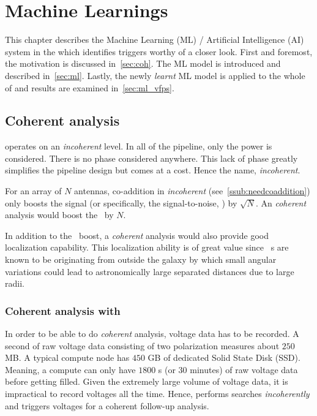 \chapter{Machine Learnings}
\label{ch:ml}

\par This chapter describes the Machine Learning (ML) / Artificial Intelligence (AI) system in the \vf which identifies triggers worthy of a closer look. First and foremost, the motivation is discussed in~\autoref{sec:coh}.
The ML model is introduced and described in~\autoref{sec:ml}. 
Lastly, the newly \emph{learnt} ML model is applied to the whole of \vfpfs and results are examined in~\autoref{sec:ml_vfps}.

\section {Coherent analysis}
\label{sec:coh}

\par \vf operates on an \emph{incoherent} level. In all of the pipeline, only the power is considered.
There is no phase considered anywhere. This lack of phase greatly simplifies the pipeline design but comes at a cost.
Hence the name, \emph{incoherent}.

\par For an array of $N$ antennas, co-addition in \emph{incoherent} (see~\autoref{ssub:needcoaddition}) only boosts the signal (or specifically, the signal-to-noise, \sn) by $\sqrt{N}$. 
An \emph{coherent} analysis would boost the \sn~by $N$.

\par In addition to the \sn~boost, a \emph{coherent} analysis would also provide good localization capability.
This localization ability is of great value since \frb~s are known to be originating from outside the galaxy by which small angular variations could lead to astronomically large separated distances due to large radii.

\subsection{Coherent analysis with \vf}

\par In order to be able to do \emph{coherent} analysis, voltage data has to be recorded. 
A second of raw voltage data consisting of two polarization measures about $250$ MB. 
A typical \vf compute node has $450$ GB of dedicated Solid State Disk (SSD). Meaning, a \vf compute can only have $1800$ s (or $30$ minutes) of raw voltage data before getting filled.
Given the extremely large volume of voltage data, it is impractical to record voltages all the time.
Hence, \vf performs searches \emph{incoherently} and triggers voltages for a coherent follow-up analysis.

